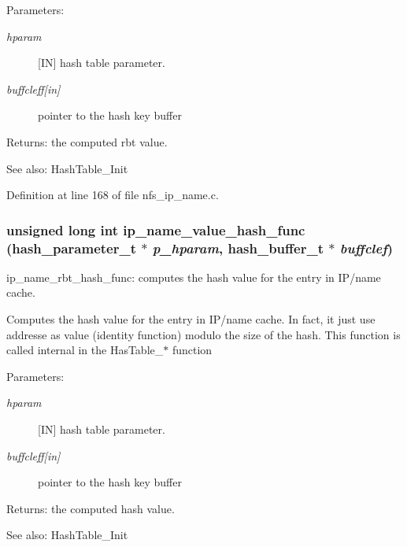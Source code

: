 \begin{Desc}
\item[Parameters:]
\begin{description}
\item[{\em hparam}][IN] hash table parameter. \item[{\em buffcleff\mbox{[}in\mbox{]}}]pointer to the hash key buffer\end{description}
\end{Desc}
\begin{Desc}
\item[Returns:]the computed rbt value.\end{Desc}
\begin{Desc}
\item[See also:]Hash\-Table\_\-Init \end{Desc}


Definition at line 168 of file nfs\_\-ip\_\-name.c.
\subsubsection{\setlength{\rightskip}{0pt plus 5cm}unsigned long int ip\_\-name\_\-value\_\-hash\_\-func (hash\_\-parameter\_\-t $\ast$ {\em p\_\-hparam}, hash\_\-buffer\_\-t $\ast$ {\em buffclef})}\label{nfs__ip__name_8c_a3}


ip\_\-name\_\-rbt\_\-hash\_\-func: computes the hash value for the entry in IP/name cache.

Computes the hash value for the entry in IP/name cache. In fact, it just use addresse as value (identity function) modulo the size of the hash. This function is called internal in the Has\-Table\_\-$\ast$ function

\begin{Desc}
\item[Parameters:]
\begin{description}
\item[{\em hparam}][IN] hash table parameter. \item[{\em buffcleff\mbox{[}in\mbox{]}}]pointer to the hash key buffer\end{description}
\end{Desc}
\begin{Desc}
\item[Returns:]the computed hash value.\end{Desc}
\begin{Desc}
\item[See also:]Hash\-Table\_\-Init \end{Desc}


